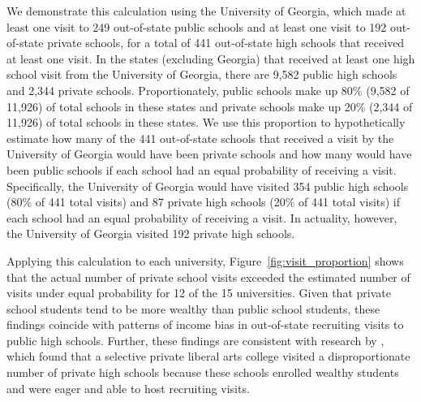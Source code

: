 \documentclass[twoside]{article}
\begin{document}



We demonstrate this calculation using the University of Georgia, which made at least one visit to 249 out-of-state public schools and at least one visit to 192 out-of-state private schools, for a total of 441 out-of-state high schools that received at least one visit.  In the states (excluding Georgia) that received at least one high school visit from the University of Georgia, there are 9,582 public high schools and 2,344 private schools.  Proportionately, public schools  make up 80\% (9,582 of 11,926) of total schools in these states and private schools make up 20\% (2,344 of 11,926) of total schools in these states. We use this proportion to hypothetically estimate how many of the 441 out-of-state schools that received a visit by the University of Georgia would have been private schools and how many would have been public schools if each school had an equal probability of receiving a visit. Specifically, the University of Georgia would have visited 354 public high schools (80\% of 441 total visits) and 87 private high schools (20\% of 441 total visits) if each school had an equal probability of receiving a visit. In actuality, however, the University of Georgia visited 192 private high schools.


Applying this calculation to each university, Figure~\ref{fig:visit_proportion} shows that the actual number of private school visits exceeded the estimated number of visits under equal probability for 12 of the 15 universities. Given that private school students tend to be more wealthy than public school students, these findings coincide with patterns of income bias in out-of-state recruiting visits to public high schools. Further, these findings are consistent with research by \cite{RN3519}, which found that a selective private liberal arts college visited a disproportionate number of private high schools because these schools enrolled wealthy students and were eager and able to host recruiting visits.
\end{document}
